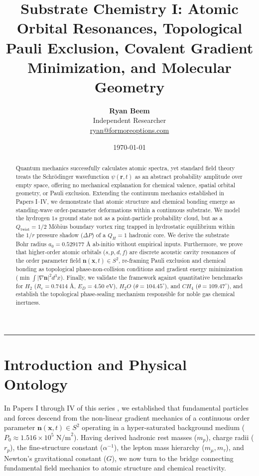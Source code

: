 \documentclass[11pt,a4paper]{article}
\title{\Large\bfseries Substrate Chemistry I: Atomic Orbital Resonances, Topological Pauli Exclusion, Covalent Gradient Minimization, and Molecular Geometry}
\author{
	\textbf{Ryan Beem}\\[0.5em]
	\small Independent Researcher \\
	\small \href{mailto:ryan@formoreoptions.com}{ryan@formoreoptions.com}
}
\date{\today}
\begin{document}
	
	\maketitle
	
	\begin{abstract}
		Quantum mechanics successfully calculates atomic spectra, yet standard field theory treats the Schrödinger wavefunction $\psi(\mathbf{r}, t)$ as an abstract probability amplitude over empty space, offering no mechanical explanation for chemical valence, spatial orbital geometry, or Pauli exclusion. Extending the continuum mechanics established in Papers I--IV, we demonstrate that atomic structure and chemical bonding emerge as standing-wave order-parameter deformations within a continuous substrate. We model the hydrogen $1s$ ground state not as a point-particle probability cloud, but as a $Q_{\text{twist}} = 1/2$ Möbius boundary vortex ring trapped in hydrostatic equilibrium within the $1/r$ pressure shadow ($\Delta P$) of a $Q_H = 1$ hadronic core. We derive the substrate Bohr radius $a_0 = 0.529177 \text{ \AA}$ ab-initio without empirical inputs. Furthermore, we prove that higher-order atomic orbitals ($s, p, d, f$) are discrete acoustic cavity resonances of the order parameter field $\mathbf{n}(\mathbf{x}, t) \in S^2$, re-framing Pauli exclusion and chemical bonding as topological phase-non-collision conditions and gradient energy minimization ($\min \int |\nabla \mathbf{n}|^2 d^3x$). Finally, we validate the framework against quantitative benchmarks for $H_2$ ($R_e = 0.7414 \text{ \AA}$, $E_D = 4.50 \text{ eV}$), $H_2O$ ($\theta = 104.45^\circ$), and $CH_4$ ($\theta = 109.47^\circ$), and establish the topological phase-sealing mechanism responsible for noble gas chemical inertness.
	\end{abstract}
	
	\vspace{1em}
	\hrule
	\vspace{1.5em}
	
	\section{Introduction and Physical Ontology}
	\label{sec:intro}
	
	In Papers I through IV of this series \cite{PaperI, PaperII, PaperIII, PaperIV}, we established that fundamental particles and forces descend from the non-linear gradient mechanics of a continuous order parameter $\mathbf{n}(\mathbf{x}, t) \in S^2$ operating in a hyper-saturated background medium ($P_0 \approx 1.516 \times 10^5 \text{ N/m}^2$). Having derived hadronic rest masses ($m_p$), charge radii ($r_p$), the fine-structure constant ($\alpha^{-1}$), the lepton mass hierarchy ($m_\mu, m_\tau$), and Newton's gravitational constant ($G$), we now turn to the bridge connecting fundamental field mechanics to atomic structure and chemical reactivity.
	
\end{document}

